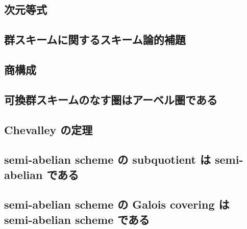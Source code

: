 \subsection{次元等式}

\subsection{群スキームに関するスキーム論的補題}


\subsection{商構成}


\subsection{可換群スキームのなす圏はアーベル圏である}

\subsection{Chevalley の定理}

\subsection{semi-abelian scheme の subquotient は semi-abelian である}

\subsection{semi-abelian scheme の Galois covering は semi-abelian scheme である}

